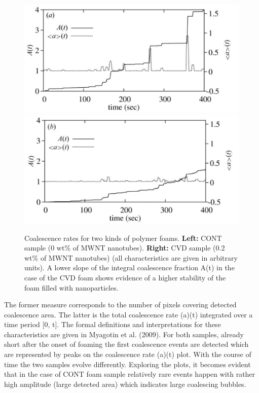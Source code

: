 \begin{figure}[ht]
  \centerline{
    \mbox{\includegraphics[scale=0.9]{figures/app_polymer_1.png}}
    \mbox{\includegraphics[scale=0.9]{figures/app_polymer_2.png}}
  }
  \caption[]{Coalescence rates for two kinds of polymer foams. \textbf{Left:} CONT sample (0 wt\% of MWNT  nanotubes). \textbf{Right:} CVD sample (0.2 wt\% of MWNT  nanotubes)  (all characteristics
are given in arbitrary units). A lower slope of the integral coalescence
fraction A(t) in the case of the CVD foam shows evidence of a higher
stability of the foam filled with nanoparticles.}
  \label{fig:foam_polymer}
\end{figure}

The former  measure corresponds to the number of pixels covering
detected coalescence area. The latter is the total coalescence
rate (a)(t) integrated over a time period [0, t]. The
formal definitions and interpretations for these characteristics are given in
Myagotin et al. (2009). For both samples, already short after the onset of foaming the first coalescence events are detected which are
represented by peaks on the coalescence rate (a)(t) plot. With the course of time the two samples evolve differently. Exploring the plots, it becomes evident that in the case of CONT foam sample relatively rare events happen with rather high amplitude (large detected area) which indicates large coalescing bubbles.


